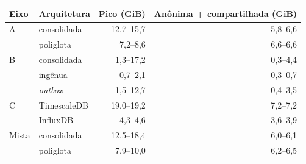 \begin{tabular}{llrr}
\hline
Eixo & Arquitetura & Pico (GiB) & Anônima + compartilhada (GiB) \\
\hline
A & consolidada & 12,7--15,7 & 5,8--6,6 \\
 & poliglota & 7,2--8,6 & 6,6--6,6 \\
\hline
B & consolidada & 1,3--17,2 & 0,3--4,4 \\
 & ingênua & 0,7--2,1 & 0,3--0,7 \\
 & \emph{outbox} & 1,5--12,7 & 0,4--3,5 \\
\hline
C & TimescaleDB & 19,0--19,2 & 7,2--7,2 \\
 & InfluxDB & 4,3--4,6 & 3,6--3,9 \\
\hline
Mista & consolidada & 12,5--18,4 & 6,0--6,1 \\
 & poliglota & 7,9--10,0 & 6,2--6,5 \\
\hline
\end{tabular}
